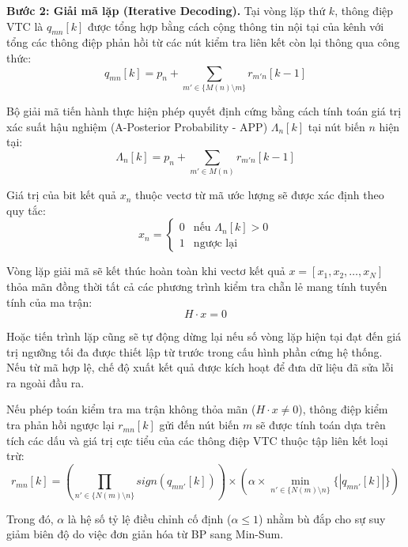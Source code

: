 \documentclass[12pt,a4paper,oneside]{book}
\begin{document}
\textbf{Bước 2: Giải mã lặp (Iterative Decoding).} Tại vòng lặp thứ $k$, thông điệp VTC là $q_{mn}[k]$ được tổng hợp bằng cách cộng thông tin nội tại của kênh với tổng các thông điệp phản hồi từ các nút kiểm tra liên kết còn lại thông qua công thức:
\begin{equation}
    q_{mn}[k] = p_n + \sum_{m' \in \{M(n) \setminus m\}} r_{m'n}[k-1]  
\end{equation}

Bộ giải mã tiến hành thực hiện phép quyết định cứng bằng cách tính toán giá trị xác suất hậu nghiệm (A-Posterior Probability - APP) $\Lambda_n[k]$ tại nút biến $n$ hiện tại:
\begin{equation}
    \Lambda_n[k] = p_n + \sum_{m' \in M(n)} r_{m'n}[k-1]
\end{equation}

Giá trị của bit kết quả $x_n$ thuộc vectơ từ mã ước lượng sẽ được xác định theo quy tắc:
\begin{equation}
    x_n = \begin{cases} 0 & \text{nếu } \Lambda_n[k] > 0 \\ 1 & \text{ngược lại} \end{cases}
    \label{eq:5}
\end{equation}

Vòng lặp giải mã sẽ kết thúc hoàn toàn khi vectơ kết quả $x = [x_1, x_2, \dots, x_N]$ thỏa mãn đồng thời tất cả các phương trình kiểm tra chẵn lẻ mang tính tuyến tính của ma trận:
\begin{equation}
    H \cdot x = 0
    \label{eq:6}
\end{equation}

Hoặc tiến trình lặp cũng sẽ tự động dừng lại nếu số vòng lặp hiện tại đạt đến giá trị ngưỡng tối đa được thiết lập từ trước trong cấu hình phần cứng hệ thống. Nếu từ mã hợp lệ, chế độ xuất kết quả được kích hoạt để đưa dữ liệu đã sửa lỗi ra ngoài đầu ra.  

Nếu phép toán kiểm tra ma trận không thỏa mãn ($H \cdot x \neq 0$), thông điệp kiểm tra phản hồi ngược lại $r_{mn}[k]$ gửi đến nút biến $m$ sẽ được tính toán dựa trên tích các dấu và giá trị cực tiểu của các thông điệp VTC thuộc tập liên kết loại trừ:
\begin{equation}
    r_{mn}[k] = \left( \prod_{n' \in \{N(m) \setminus n\}} sign(q_{mn'}[k]) \right) \times \left( \alpha \times \min_{n' \in \{N(m) \setminus n\}} \{|q_{mn'}[k]|\} \right)
\end{equation}

Trong đó, $\alpha$ là hệ số tỷ lệ điều chỉnh cố định ($\alpha \le 1$) nhằm bù đắp cho sự suy giảm biên độ do việc đơn giản hóa từ BP sang Min-Sum.
\end{document}
